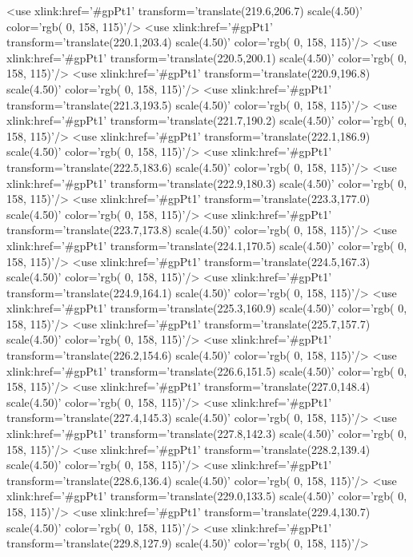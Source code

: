 	<use xlink:href='#gpPt1' transform='translate(219.6,206.7) scale(4.50)' color='rgb(  0, 158, 115)'/>
	<use xlink:href='#gpPt1' transform='translate(220.1,203.4) scale(4.50)' color='rgb(  0, 158, 115)'/>
	<use xlink:href='#gpPt1' transform='translate(220.5,200.1) scale(4.50)' color='rgb(  0, 158, 115)'/>
	<use xlink:href='#gpPt1' transform='translate(220.9,196.8) scale(4.50)' color='rgb(  0, 158, 115)'/>
	<use xlink:href='#gpPt1' transform='translate(221.3,193.5) scale(4.50)' color='rgb(  0, 158, 115)'/>
	<use xlink:href='#gpPt1' transform='translate(221.7,190.2) scale(4.50)' color='rgb(  0, 158, 115)'/>
	<use xlink:href='#gpPt1' transform='translate(222.1,186.9) scale(4.50)' color='rgb(  0, 158, 115)'/>
	<use xlink:href='#gpPt1' transform='translate(222.5,183.6) scale(4.50)' color='rgb(  0, 158, 115)'/>
	<use xlink:href='#gpPt1' transform='translate(222.9,180.3) scale(4.50)' color='rgb(  0, 158, 115)'/>
	<use xlink:href='#gpPt1' transform='translate(223.3,177.0) scale(4.50)' color='rgb(  0, 158, 115)'/>
	<use xlink:href='#gpPt1' transform='translate(223.7,173.8) scale(4.50)' color='rgb(  0, 158, 115)'/>
	<use xlink:href='#gpPt1' transform='translate(224.1,170.5) scale(4.50)' color='rgb(  0, 158, 115)'/>
	<use xlink:href='#gpPt1' transform='translate(224.5,167.3) scale(4.50)' color='rgb(  0, 158, 115)'/>
	<use xlink:href='#gpPt1' transform='translate(224.9,164.1) scale(4.50)' color='rgb(  0, 158, 115)'/>
	<use xlink:href='#gpPt1' transform='translate(225.3,160.9) scale(4.50)' color='rgb(  0, 158, 115)'/>
	<use xlink:href='#gpPt1' transform='translate(225.7,157.7) scale(4.50)' color='rgb(  0, 158, 115)'/>
	<use xlink:href='#gpPt1' transform='translate(226.2,154.6) scale(4.50)' color='rgb(  0, 158, 115)'/>
	<use xlink:href='#gpPt1' transform='translate(226.6,151.5) scale(4.50)' color='rgb(  0, 158, 115)'/>
	<use xlink:href='#gpPt1' transform='translate(227.0,148.4) scale(4.50)' color='rgb(  0, 158, 115)'/>
	<use xlink:href='#gpPt1' transform='translate(227.4,145.3) scale(4.50)' color='rgb(  0, 158, 115)'/>
	<use xlink:href='#gpPt1' transform='translate(227.8,142.3) scale(4.50)' color='rgb(  0, 158, 115)'/>
	<use xlink:href='#gpPt1' transform='translate(228.2,139.4) scale(4.50)' color='rgb(  0, 158, 115)'/>
	<use xlink:href='#gpPt1' transform='translate(228.6,136.4) scale(4.50)' color='rgb(  0, 158, 115)'/>
	<use xlink:href='#gpPt1' transform='translate(229.0,133.5) scale(4.50)' color='rgb(  0, 158, 115)'/>
	<use xlink:href='#gpPt1' transform='translate(229.4,130.7) scale(4.50)' color='rgb(  0, 158, 115)'/>
	<use xlink:href='#gpPt1' transform='translate(229.8,127.9) scale(4.50)' color='rgb(  0, 158, 115)'/>
